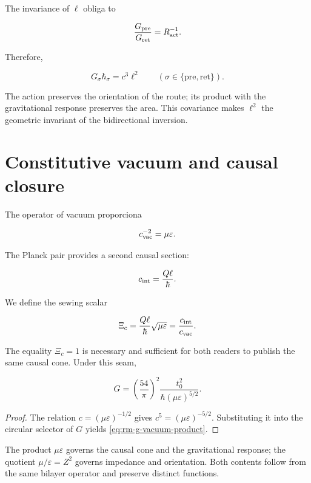 The invariance of \(\ell\) obliga to

\[
\frac{G_{\rm pre}}{G_{\rm ret}}=R_{\rm act}^{-1}.
\]

Therefore,

\begin{equation}
G_{\sigma}\hbar_{\sigma}=c^3\ell^2
\qquad(\sigma\in\{\mathrm{pre},\mathrm{ret}\}).
\label{eq:rm-two-way-area}
\end{equation}

The action preserves the orientation of the route; its product with the
gravitational response preserves the area. This covariance makes \(\ell^2\)
the geometric invariant of the bidirectional inversion.

\section{Constitutive vacuum and causal closure}

The operator of vacuum proporciona

\[
c_{\rm vac}^{-2}=\mu\varepsilon.
\]

The Planck pair provides a second causal section:

\[
c_{\rm int}=\frac{Q\ell}{\hbar}.
\]

We define the sewing scalar

\begin{equation}
\Xi_c=\frac{Q\ell}{\hbar}\sqrt{\mu\varepsilon}
=\frac{c_{\rm int}}{c_{\rm vac}}.
\label{eq:rm-causal-seam}
\end{equation}

The equality \(\Xi_c=1\) is necessary and sufficient for both readers to
publish the same causal cone. Under this seam,

\begin{equation}
\boxed{
G=\left(\frac{54}{\pi}\right)^2
\frac{t_0^2}{\hbar(\mu\varepsilon)^{5/2}}.}
\label{eq:rm-g-vacuum-product}
\end{equation}

\begin{proof}
The relation \(c=(\mu\varepsilon)^{-1/2}\) gives
\(c^5=(\mu\varepsilon)^{-5/2}\). Substituting it into the circular selector of
\(G\) yields \eqref{eq:rm-g-vacuum-product}.
\end{proof}

The product \(\mu\varepsilon\) governs the causal cone and the gravitational
response; the quotient \(\mu/\varepsilon=Z^2\) governs impedance and
orientation. Both contents follow from the same bilayer operator and preserve
distinct functions.

